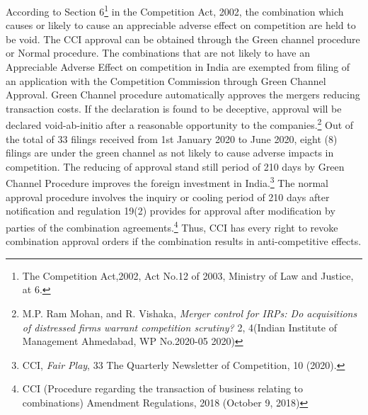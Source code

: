 \begin{multicols}{2}
\vspace{.2cm}


\noi
According to Section 6\footnote{The Competition Act,2002, Act No.12 of 2003, Ministry of Law and Justice, at 6.} in the Competition Act, 2002, the combination which causes or
likely to cause an appreciable adverse effect on competition are held to be void. The CCI
approval can be obtained through the Green channel procedure or Normal procedure. The
combinations that are not likely to have an Appreciable Adverse Effect on competition in
India are exempted from filing of an application with the Competition Commission through
Green Channel Approval. Green Channel procedure automatically approves the mergers
reducing transaction costs. If the declaration is found to be deceptive, approval will be
declared void-ab-initio after a reasonable opportunity to the companies.\footnote{M.P. Ram Mohan, and R. Vishaka, \textit{Merger control for IRPs: Do acquisitions of distressed firms warrant
competition scrutiny?} 2, 4(Indian Institute of Management Ahmedabad, WP No.2020-05 2020)} Out of the total of
33 filings received from 1st January 2020 to June 2020, eight (8) filings are under the green
channel as not likely to cause adverse impacts in competition. The reducing of approval stand
still period of 210 days by Green Channel Procedure improves the foreign investment in
India.\footnote{CCI, \textit{Fair Play}, 33 The Quarterly Newsletter of Competition, 10 (2020).} The normal approval procedure involves the inquiry or cooling period of 210 days
after notification and regulation 19(2) provides for approval after modification by parties of
the combination agreements.\footnote{CCI (Procedure regarding the transaction of business relating to combinations) Amendment Regulations,
2018 (October 9, 2018)} Thus, CCI has every right to revoke combination approval
orders if the combination results in anti-competitive effects.

\vspace{.2cm}



\end{multicols}
